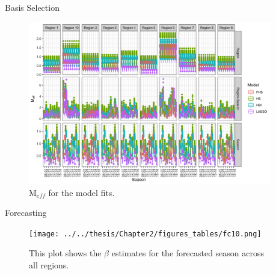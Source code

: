\documentclass[final]{beamer}
\newlength{\sepwid}
\newlength{\onecolwid}
\begin{document}
\begin{frame}[t]
\begin{columns}[t]
\begin{column}{\sepwid}\end{column} %

\begin{column}{\onecolwid} %


\begin{block}{Basis Selection}

\begin{figure}
\includegraphics[width=\linewidth]{plots/meff.png}
\caption{$\text{M}_{eff}$ for the model fits.}
\end{figure}


\end{block}

\vspace{-20mm}

\begin{block}{Forecasting}
\begin{figure}
\texttt{[image: ../../thesis/Chapter2/figures\_tables/fc10.png]}
\caption{This plot shows the $\beta$ estimates for the forecasted season across all regions.}
\end{figure}
\end{block}


\end{column}
\end{columns}
\end{frame}
\end{document}
